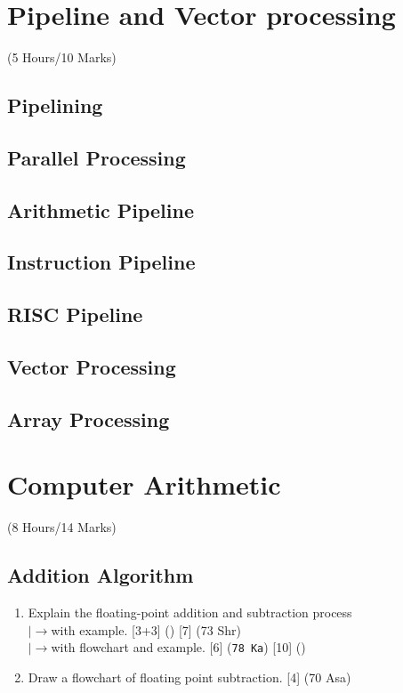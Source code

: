 \documentclass[12pt]{article}
\newcommand{\lb}{\\$\left|\rightarrow\right.$}
\begin{document}
	\pagebreak
\section{Pipeline and Vector processing}
	\begin{center}(5 Hours/10 Marks)\end{center}
	\subsection{Pipelining}
	\subsection{Parallel Processing}
	\subsection{Arithmetic Pipeline}
	\subsection{Instruction Pipeline}
	\subsection{RISC Pipeline}
	\subsection{Vector Processing}
	\subsection{Array Processing}

	\pagebreak
\section{Computer Arithmetic}
	\begin{center}(8 Hours/14 Marks)\end{center}
	\subsection{Addition Algorithm}
	\begin{enumerate}[noitemsep, topsep=0pt]
		\item Explain the floating-point addition and subtraction process
		\lb with example. \hfill [3+3] () [7] (73 Shr)
		\lb with flowchart and example. \hfill [6] (\texttt{78 Ka}) [10] ()
		
		\item Draw a flowchart of floating point subtraction. \hfill [4] (70 Asa)
	\end{enumerate}
\end{document}

